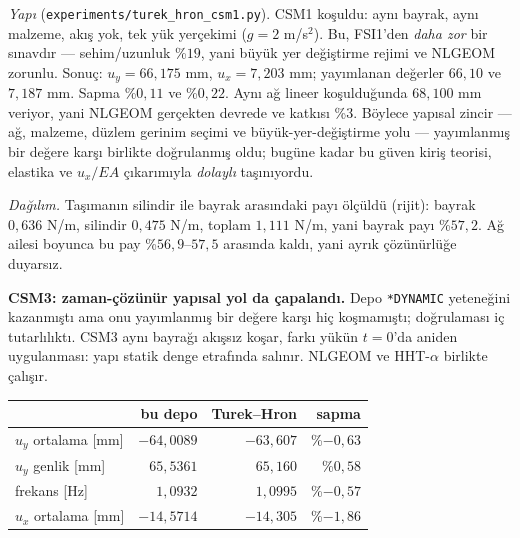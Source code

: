 \documentclass[11pt,a4paper]{article}
\begin{document}
\begin{description}
        \noindent \emph{Yapı} (\texttt{experiments/turek\_hron\_csm1.py}).
        CSM1 koşuldu: aynı bayrak, aynı malzeme, akış yok, tek yük
        yerçekimi ($g = 2$ m/s$^2$). Bu, FSI1'den \emph{daha zor} bir
        sınavdır --- sehim/uzunluk \%$19$, yani büyük yer değiştirme
        rejimi ve NLGEOM zorunlu. Sonuç: $u_y = 66{,}175$ mm,
        $u_x = 7{,}203$ mm; yayımlanan değerler $66{,}10$ ve $7{,}187$ mm.
        Sapma \%$0{,}11$ ve \%$0{,}22$. Aynı ağ lineer koşulduğunda
        $68{,}100$ mm veriyor, yani NLGEOM gerçekten devrede ve katkısı
        \%$3$. Böylece yapısal zincir --- ağ, malzeme, düzlem gerinim
        seçimi ve büyük-yer-değiştirme yolu --- yayımlanmış bir değere
        karşı birlikte doğrulanmış oldu; bugüne kadar bu güven kiriş
        teorisi, elastika ve $u_x/EA$ çıkarımıyla \emph{dolaylı}
        taşınıyordu.

        \noindent \emph{Dağılım.} Taşımanın silindir ile bayrak arasındaki
        payı ölçüldü (rijit): bayrak $0{,}636$ N/m, silindir $0{,}475$
        N/m, toplam $1{,}111$ N/m, yani bayrak payı \%$57{,}2$. Ağ ailesi
        boyunca bu pay \%$56{,}9$--$57{,}5$ arasında kaldı, yani ayrık
        çözünürlüğe duyarsız.

        \medskip
        \noindent \textbf{CSM3: zaman-çözünür yapısal yol da çapalandı.}
        Depo \texttt{*DYNAMIC} yeteneğini kazanmıştı ama onu yayımlanmış
        bir değere karşı hiç koşmamıştı; doğrulaması iç tutarlılıktı. CSM3
        aynı bayrağı akışsız koşar, farkı yükün $t=0$'da aniden
        uygulanması: yapı statik denge etrafında salınır. NLGEOM ve
        HHT-$\alpha$ birlikte çalışır.

        \begin{center}\small
        \begin{tabular}{lrrr}
        \toprule
        & bu depo & Turek--Hron & sapma \\
        \midrule
        $u_y$ ortalama [mm] & $-64{,}0089$ & $-63{,}607$ & \%$-0{,}63$ \\
        $u_y$ genlik [mm]   & $65{,}5361$  & $65{,}160$  & \%$0{,}58$ \\
        frekans [Hz]        & $1{,}0932$   & $1{,}0995$  & \%$-0{,}57$ \\
        $u_x$ ortalama [mm] & $-14{,}5714$ & $-14{,}305$ & \%$-1{,}86$ \\
        \bottomrule
        \end{tabular}
        \end{center}


\end{description}
\end{document}
